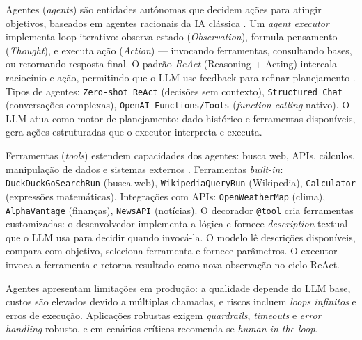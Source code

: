 \documentclass[12pt]{article}
\begin{document}
Agentes (\textit{agents}) são entidades autônomas que decidem ações para atingir objetivos, baseados em agentes racionais da IA clássica \cite{russell2010artificial}. Um \textit{agent executor} implementa loop iterativo: observa estado (\textit{Observation}), formula pensamento (\textit{Thought}), e executa ação (\textit{Action}) — invocando ferramentas, consultando bases, ou retornando resposta final. O padrão \textit{ReAct} (Reasoning + Acting) intercala raciocínio e ação, permitindo que o LLM use feedback para refinar planejamento \cite{yao2023react}. Tipos de agentes: \texttt{Zero-shot ReAct} (decisões sem contexto), \texttt{Structured Chat} (conversações complexas), \texttt{OpenAI Functions/Tools} (\textit{function calling} nativo). O LLM atua como motor de planejamento: dado histórico e ferramentas disponíveis, gera ações estruturadas que o executor interpreta e executa.


Ferramentas (\textit{tools}) estendem capacidades dos agentes: busca web, APIs, cálculos, manipulação de dados e sistemas externos \cite{langchain2023docs}. Ferramentas \textit{built-in}: \texttt{DuckDuckGoSearchRun} (busca web), \texttt{WikipediaQueryRun} (Wikipedia), \texttt{Calculator} (expressões matemáticas). Integrações com APIs: \texttt{OpenWeatherMap} (clima), \texttt{AlphaVantage} (finanças), \texttt{NewsAPI} (notícias). O decorador \texttt{@tool} cria ferramentas customizadas: o desenvolvedor implementa a lógica e fornece \textit{description} textual que o LLM usa para decidir quando invocá-la. O modelo lê descrições disponíveis, compara com objetivo, seleciona ferramenta e fornece parâmetros. O executor invoca a ferramenta e retorna resultado como nova observação no ciclo ReAct.


Agentes apresentam limitações em produção: a qualidade depende do LLM base, custos são elevados devido a múltiplas chamadas, e riscos incluem \textit{loops infinitos} e erros de execução. Aplicações robustas exigem \textit{guardrails}, \textit{timeouts} e \textit{error handling} robusto, e em cenários críticos recomenda-se \textit{human-in-the-loop}.
\end{document}
